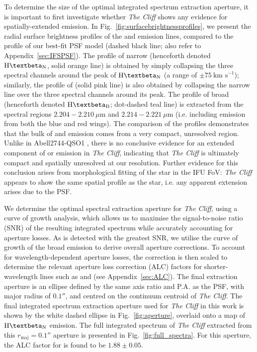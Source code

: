 \documentclass[fleqn,usenatbib]{mnras}
\newcommand{\Halpha}{\text{H\textalpha}\xspace}
\newcommand{\Hbeta}{\text{H\textbeta}\xspace}
\newcommand{\kms}{\ensuremath{\text{km s}^{-1}}\xspace}
\newcommand{\cliff}{\textit{The Cliff}\xspace}
\begin{document}
To determine the size of the optimal integrated spectrum extraction aperture, it is important to first investigate whether \cliff shows any evidence for spatially-extended emission. 
In Fig.~\ref{fig:surfacebrightnessprofiles}, we present the radial surface brightness profiles of the \Hbeta and \OIIIL emission lines, compared to the profile of our best-fit PSF model (dashed black line; also refer to Appendix~\ref{sec:IFSPSF}).  
The profile of narrow \Hbeta (henceforth denoted $\Hbeta_\mathrm{N}$, solid orange line) is obtained by simply collapsing the three spectral channels around the peak of $\Hbeta_\mathrm{N}$ (a range of $\pm 75~\kms$); similarly, the profile of \OIIIL (solid pink line) is also obtained by collapsing the narrow line over the three spectral channels around its peak. 
The profile of broad \Hbeta (henceforth denoted $\Hbeta_\mathrm{B}$; dot-dashed teal line) is extracted from the spectral regions $2.204-2.210\ \mu$m and $2.214-2.221 \ \mu$m (i.e. including emission from both the blue and red wings). 
The comparison of the profiles demonstrates that the bulk of \Hbeta and \OIIIL emission comes from a very compact, unresolved region. 
Unlike in Abell2744-QSO1 \citep[hereafter QSO1;][]{Maiolino2025_QSO1}, there is no conclusive evidence for an extended component of \Hbeta or \OIIIL emission in \cliff, indicating that \cliff is ultimately compact and spatially unresolved at our resolution. Further evidence for this conclusion arises from morphological fitting of the star in the IFU FoV: \cliff appears to show the same spatial profile as the star, i.e. any apparent extension arises due to the PSF.

We determine the optimal spectral extraction aperture for \cliff, using a curve of growth analysis, which allows us to maximise the  signal-to-noise ratio (SNR) of the resulting integrated spectrum while accurately accounting for aperture losses. 
As \Halpha is detected with the greatest SNR, we utilise the curve of growth of the broad \Halpha emission to derive overall aperture corrections. 
To account for wavelength-dependent aperture losses, the \Halpha correction is then scaled to determine the relevant aperture loss correction (ALC) factors for shorter-wavelength lines such as \Hbeta and \OIIIL (see Appendix~\ref{sec:ALC}). 
The final extraction aperture is an ellipse defined by the same axis ratio and P.A. as the PSF, with major radius of $0.1''$, and centred on the continuum centroid of \cliff.
The final integrated spectrum extraction aperture used for \cliff in this work is shown by the white dashed ellipse in Fig.~\ref{fig:aperture}, overlaid onto a map of $\Hbeta_\mathrm{N}$ emission.
The full integrated spectrum of \cliff extracted from this $r_\mathrm{maj}=0.1''$ aperture is presented in Fig.~\ref{fig:full_spectra}. For this aperture, the ALC factor for \Halpha is found to be $1.88\pm0.05$.
\end{document}
